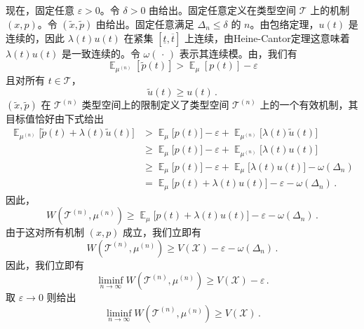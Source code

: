\documentclass[12pt,letterpaper]{article}
\newenvironment{translation}{\color{blue}\noindent}{}
\theoremstyle{plain}
\theoremstyle{definition}
\theoremstyle{remark}
\DeclareMathOperator{\E}{\mathds{E}}
\renewcommand{\1}{\mathds{1}}
\newcommand{\X}{\mathcal{X}}
\theoremstyle{definition}
\begin{document}
\begin{translation}
现在，固定任意 $\varepsilon > 0$。令 $\delta > 0$ 由给出。固定任意定义在类型空间 $\mathcal{T}$ 上的机制 $(x, p)$。令 $(\tilde{x}, \tilde{p})$ 由给出。固定任意满足 $\Delta_n \leq \delta$ 的 $n$。由包络定理，$u(t)$ 是连续的，因此 $\lambda(t)u(t)$ 在紧集 $[\underline{t}, \overline{t}]$ 上连续，由Heine-Cantor定理这意味着 $\lambda(t)u(t)$ 是一致连续的。令 $\omega(\,\cdot\,)$ 表示其连续模。由，我们有
\[\E_{\mu^{(n)}}[\tilde{p}(t)] > \E_{\mu}[p(t)] - \varepsilon\]
且对所有 $t \in \mathcal{T}$，
\[\tilde{u}(t) \geq u(t)\,.\]
$(\tilde{x}, \tilde{p})$ 在 $\mathcal{T}^{(n)}$ 类型空间上的限制定义了类型空间 $\mathcal{T}^{(n)}$ 上的一个有效机制，其目标值恰好由下式给出
\begin{align*}
    \E_{\mu^{(n)}}\Big[\tilde{p}(t) + \lambda(t) \tilde{u}(t) \Big] &>  \E_{\mu}\Big[p(t)\Big] - \varepsilon + \E_{\mu^{(n)}}\Big[\lambda(t) \tilde{u}(t) \Big]\\
    &\geq  \E_{\mu}\Big[p(t)\Big] - \varepsilon + \E_{\mu^{(n)}}\Big[\lambda(t) u(t) \Big]\\
    &\geq  \E_{\mu}\Big[p(t)\Big] - \varepsilon + \E_{\mu}\Big[\lambda(t) u(t) \Big] - \omega(\Delta_n)\\
    & =  \E_{\mu}\Big[p(t) + \lambda(t) u(t) \Big] - \varepsilon - \omega(\Delta_n)\,.
\end{align*}
因此，
\[W(\mathcal{T}^{(n)}, \mu^{(n)}) \geq  \E_{\mu}\Big[p(t) + \lambda(t) u(t) \Big] - \varepsilon - \omega(\Delta_n)\,.\]
由于这对所有机制 $(x, p)$ 成立，我们立即有
\[W(\mathcal{T}^{(n)}, \mu^{(n)}) \geq  V(\X) - \varepsilon - \omega(\Delta_n)\,.\]
因此，我们立即有
\[\liminf_{n\rightarrow\infty} W(\mathcal{T}^{(n)}, \mu^{(n)}) \geq  V(\X) - \varepsilon \,.\]
取 $\varepsilon \rightarrow 0$ 则给出
\[\liminf_{n\rightarrow\infty} W(\mathcal{T}^{(n)}, \mu^{(n)}) \geq  V(\X) \,.\]


\end{translation}
\end{document}
